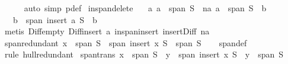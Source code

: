 \begin{isabellebody}
\ \ \ \ \isamarkupfalse%
\ {\isacharparenleft}{\kern0pt}auto\ simp{\isacharcolon}{\kern0pt}\ p{\isacharunderscore}{\kern0pt}def{\isacharparenright}{\kern0pt}\isanewline
{}\isamarkupfalse%
%
\endisatagproof
{\isafoldproof}%
%
\isadelimproof
\isanewline
%
\endisadelimproof
\isanewline
{}\isamarkupfalse%
\ in{\isacharunderscore}{\kern0pt}span{\isacharunderscore}{\kern0pt}delete{\isacharcolon}{\kern0pt}\isanewline
\ \ \ a{\isacharcolon}{\kern0pt}\ {\isachardoublequoteopen}a\ {\isasymin}\ span\ S{\isachardoublequoteclose}\ \ na{\isacharcolon}{\kern0pt}\ {\isachardoublequoteopen}a\ {\isasymnotin}\ span\ {\isacharparenleft}{\kern0pt}S\ {\isacharminus}{\kern0pt}\ {\isacharbraceleft}{\kern0pt}b{\isacharbraceright}{\kern0pt}{\isacharparenright}{\kern0pt}{\isachardoublequoteclose}\isanewline
\ \ \ {\isachardoublequoteopen}b\ {\isasymin}\ span\ {\isacharparenleft}{\kern0pt}insert\ a\ {\isacharparenleft}{\kern0pt}S\ {\isacharminus}{\kern0pt}\ {\isacharbraceleft}{\kern0pt}b{\isacharbraceright}{\kern0pt}{\isacharparenright}{\kern0pt}{\isacharparenright}{\kern0pt}{\isachardoublequoteclose}\isanewline
%
\isadelimproof
\ \ %
\endisadelimproof
%
\isatagproof
{}\isamarkupfalse%
\ {\isacharparenleft}{\kern0pt}metis\ Diff{\isacharunderscore}{\kern0pt}empty\ Diff{\isacharunderscore}{\kern0pt}insert{}\ a\ in{\isacharunderscore}{\kern0pt}span{\isacharunderscore}{\kern0pt}insert\ insert{\isacharunderscore}{\kern0pt}Diff\ na{\isacharparenright}{\kern0pt}%
\endisatagproof
{\isafoldproof}%
%
\isadelimproof
\isanewline
%
\endisadelimproof
\isanewline
{}\isamarkupfalse%
\ span{\isacharunderscore}{\kern0pt}redundant{\isacharcolon}{\kern0pt}\ {\isachardoublequoteopen}x\ {\isasymin}\ span\ S\ {\isasymLongrightarrow}\ span\ {\isacharparenleft}{\kern0pt}insert\ x\ S{\isacharparenright}{\kern0pt}\ {\isacharequal}{\kern0pt}\ span\ S{\isachardoublequoteclose}\isanewline
%
\isadelimproof
\ \ %
\endisadelimproof
%
\isatagproof
{}\isamarkupfalse%
\ span{\isacharunderscore}{\kern0pt}def\ \isamarkupfalse%
\ {\isacharparenleft}{\kern0pt}rule\ hull{\isacharunderscore}{\kern0pt}redundant{\isacharparenright}{\kern0pt}%
\endisatagproof
{\isafoldproof}%
%
\isadelimproof
\isanewline
%
\endisadelimproof
\isanewline
{}\isamarkupfalse%
\ span{\isacharunderscore}{\kern0pt}trans{\isacharcolon}{\kern0pt}\ {\isachardoublequoteopen}x\ {\isasymin}\ span\ S\ {\isasymLongrightarrow}\ y\ {\isasymin}\ span\ {\isacharparenleft}{\kern0pt}insert\ x\ S{\isacharparenright}{\kern0pt}\ {\isasymLongrightarrow}\ y\ {\isasymin}\ span\ S{\isachardoublequoteclose}\isanewline

\end{isabellebody}
